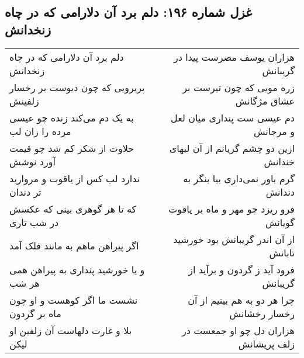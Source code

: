 \begin{center}
\section*{غزل شماره ۱۹۶: دلم برد آن دلارامی که در چاه زنخدانش}
\label{sec:196}
\begin{longtable}{l p{0.5cm} r}
دلم برد آن دلارامی که در چاه زنخدانش
&&
هزاران یوسف مصرست پیدا در گریبانش
\\
پریرویی که چون دیوست بر رخسار زلفینش
&&
زره مویی که چون تیرست بر عشاق مژگانش
\\
به یک دم می‌کند زنده چو عیسی مرده را زان لب
&&
دم عیسی ست پنداری میان لعل و مرجانش
\\
حلاوت از شکر کم شد چو قیمت آورد نوشش
&&
ازین دو چشم گریانم از آن لبهای خندانش
\\
ندارد لب کس از یاقوت و مروارید تر دندان
&&
گرم باور نمی‌داری بیا بنگر به دندانش
\\
که تا هر گوهری بینی که عکسش در شب تاری
&&
فرو ریزد چو مهر و ماه بر یاقوت گویانش
\\
اگر پیراهن ماهم به مانند فلک آمد
&&
از آن اندر گریبانش بود خورشید تابانش
\\
و یا خورشید پنداری به پیراهن همی هر شب
&&
فرود آید ز گردون و برآید از گریبانش
\\
نشست ما اگر کوهست و او چون ماه بر گردون
&&
چرا هر دو به هم بینیم از آن رخسار رخشانش
\\
بلا و غارت دلهاست آن زلفین او لیکن
&&
هزاران دل چو او جمعست در زلف پریشانش
\\
\end{longtable}
\end{center}
